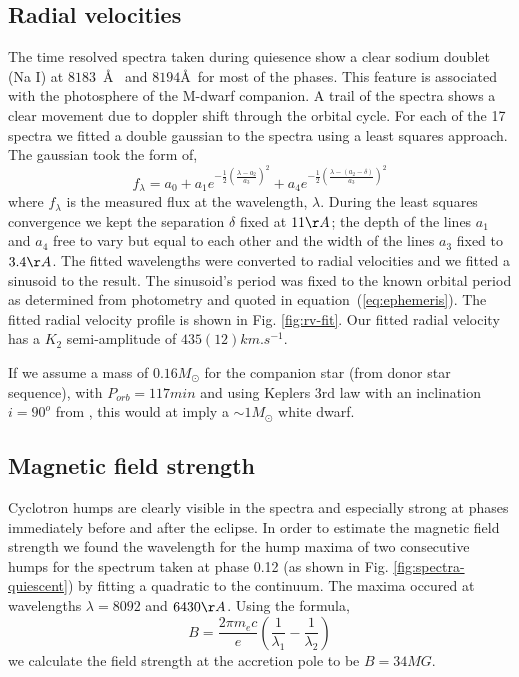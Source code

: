 \documentclass[a4paper,fleqn,usenatbib]{mnras}
\begin{document}
\subsection{Radial velocities}
The time resolved spectra taken during quiesence show a clear sodium doublet (Na I) at $8183$~\AA~ and $8194$\AA \, for most of the phases. This feature is associated with the photosphere of the M-dwarf companion. A trail of the spectra shows a clear movement due to doppler shift through the orbital cycle. For each of the 17 spectra we fitted a double gaussian to the spectra using a least squares approach. The gaussian took the form of, 
\begin{equation}f_\lambda = a_0 + a_1 e^{-\frac{1}{2}(\frac{\lambda - a_2}{a_3})^2} + a_4 e^{-\frac{1}{2}(\frac{\lambda - (a_2 - \delta)}{a_3})^2}  \end{equation}
where $f_\lambda$ is the measured flux at the wavelength, $\lambda$. During the least squares convergence we kept the separation $\delta$ fixed at $11 \AA$; the depth of the lines $a_1$ and $a_4$ free to vary but equal to each other and the width of the lines $a_3$ fixed to $3.4 \AA$. The fitted wavelengths were converted to radial velocities and we fitted a sinusoid to the result. The sinusoid's period was fixed to the known orbital period as determined from photometry and quoted in equation~(\ref{eq:ephemeris}). The fitted radial velocity profile is shown in Fig. \ref{fig:rv-fit}. Our fitted radial velocity has a $K_2$ semi-amplitude of $435(12) km.s^{-1}$. 

If we assume a mass of $0.16M_{\odot}$ for the companion star (from \citet{Knigge2011} donor star sequence), with $P_{orb} = 117min$ and using Keplers 3rd law with an inclination $i=90^o$ from \citet{Schwope2015}, this would at imply a $\sim 1M_{\odot}$ white dwarf.

\subsection{Magnetic field strength}
Cyclotron humps are clearly visible in the spectra and especially strong at phases immediately before and after the eclipse. In order to estimate the magnetic field strength we found the wavelength for the hump maxima of two consecutive humps for the spectrum taken at phase 0.12 (as shown in Fig. \ref{fig:spectra-quiescent}) by fitting a quadratic to the continuum. The maxima occured at wavelengths $\lambda  = 8092$ and $6430 \AA$. Using the formula, 
\begin{equation}B = \frac{2 \pi m_e c}{e}(\frac{1}{\lambda_1} - \frac{1}{\lambda_2})\end{equation}
we calculate the field strength at the accretion pole to be $B = 34MG$.
\end{document}
